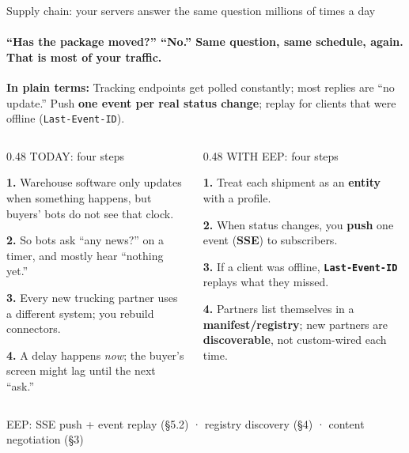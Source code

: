 \documentclass[aspectratio=169,10pt]{beamer}
\begin{document}
\begin{frame}{Supply chain: your servers answer the same question millions of times a day}
\framesubtitle{``Has the package moved?'' ``No.'' Same question, same schedule, again. That is most of your traffic.}

\vspace{0.06cm}
{\small\color{amber}\textbf{In plain terms:}\; Tracking endpoints get polled constantly; most replies are ``no update.'' Push \textbf{one event per real status change}; replay for clients that were offline (\texttt{Last-Event-ID}).}

\vspace{0.08cm}
\begin{columns}[T]
\begin{column}{0.48\textwidth}
{\small\color{rose} TODAY: four steps}\par
\vspace{2pt}
{\small\color{txtm}%
\textbf{1.}\; Warehouse software only updates when something happens, but buyers' bots do not see that clock.\par
\textbf{2.}\; So bots ask ``any news?'' on a timer, and mostly hear ``nothing yet.''\par
\textbf{3.}\; Every new trucking partner uses a different system; you rebuild connectors.\par
\textbf{4.}\; A delay happens \emph{now}; the buyer's screen might lag until the next ``ask.''\par
}
\end{column}

\begin{column}{0.48\textwidth}
{\small\color{mint} WITH EEP: four steps}\par
\vspace{2pt}
{\small\color{txtm}%
\textbf{1.}\; Treat each shipment as an \textbf{entity} with a profile.\par
\textbf{2.}\; When status changes, you \textbf{push} one event (\textbf{SSE}) to subscribers.\par
\textbf{3.}\; If a client was offline, \textbf{\texttt{Last-Event-ID}} replays what they missed.\par
\textbf{4.}\; Partners list themselves in a \textbf{manifest/registry}; new partners are \textbf{discoverable}, not custom-wired each time.\par
}
\end{column}
\end{columns}

\vspace{4pt}
{\footnotesize\color{slate} EEP: SSE push + event replay (§5.2) · registry discovery (§4) · content negotiation (§3)}
\end{frame}
\end{document}
